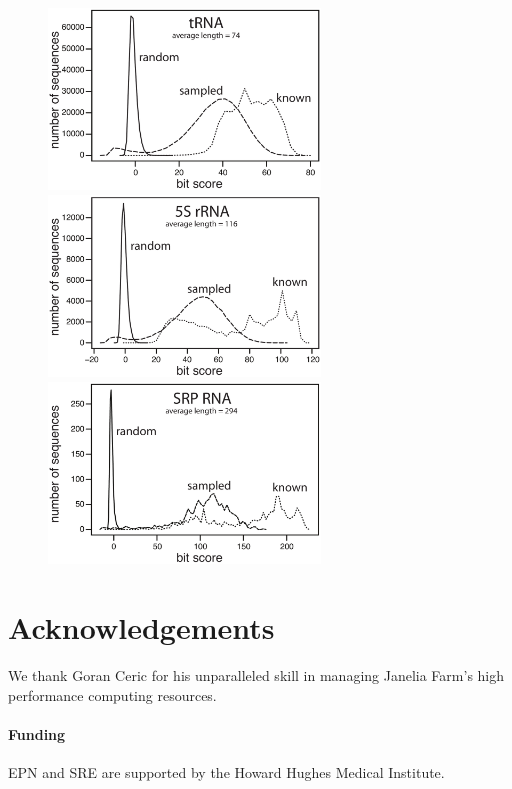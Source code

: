 \documentclass{bioinfo}
\begin{document}
\begin{figure}[!tpb]
\centerline{\includegraphics[height=1.9in]{figs/tRNA_sh}}
\centerline{\includegraphics[height=1.9in]{figs/5S_sh}}
\centerline{\includegraphics[height=1.9in]{figs/SRP_sh}}

\label{Fig:hists}
\end{figure}

\begin{methods}

\end{methods}




\section*{Acknowledgements}
We thank Goran Ceric for his unparalleled skill in managing Janelia Farm's
high performance computing resources.

\paragraph*{Funding\textcolon} 
EPN and SRE are supported by the Howard Hughes Medical Institute.
\end{document}
